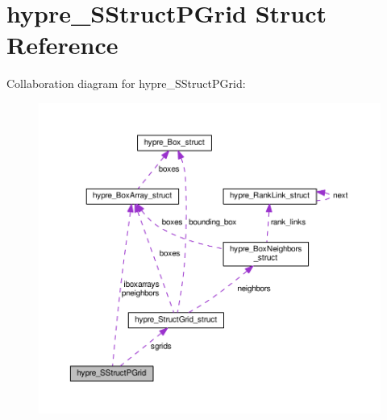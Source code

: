 \hypertarget{structhypre__SStructPGrid}{}\section{hypre\+\_\+\+S\+Struct\+P\+Grid Struct Reference}
\label{structhypre__SStructPGrid}


Collaboration diagram for hypre\+\_\+\+S\+Struct\+P\+Grid\+:
\nopagebreak
\begin{figure}[H]
\begin{center}
\leavevmode
\includegraphics[width=350pt]{structhypre__SStructPGrid__coll__graph}
\end{center}
\end{figure}
